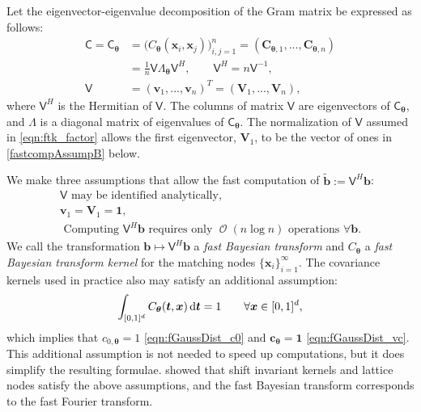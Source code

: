 \documentclass[graybox,footinfo]{svmult}
\DeclareMathOperator{\Order}{{\mathcal O}}
\newcommand{\bm}[1]{\boldsymbol{#1}}
\newcommand{\vtheta}{{\bm{\theta}}}
\newcommand{\vb}{\bm{b}}
\newcommand{\vc}{\bm{c}}
\newcommand{\vC}{\bm{C}}
\newcommand{\vt}{\bm{t}}
\newcommand{\vv}{\bm{v}}
\newcommand{\vV}{\bm{V}}
\newcommand{\vx}{\bm{x}}
\newcommand{\vone}{\bm{1}}
\newcommand{\mC}{\mathsf{C}}
\newcommand{\mCtheta}{{\mathsf{C}_{\vtheta}}}
\newcommand{\mLambda}{\mathsf{\Lambda}}
\newcommand{\mV}{\mathsf{V}}
\begin{document}
Let the eigenvector-eigenvalue decomposition of the Gram matrix be expressed as follows:
\begin{align}
\nonumber
\mC = \mCtheta &= \Big(C_\vtheta(\vx_i,\vx_j)\Big)_{i,j=1}^n  = (\vC_{\vtheta,1},...,\vC_{\vtheta,n}) 
\\
\label{eqn:ftk_factor}
&= \frac 1n \mV \mLambda_\vtheta \mV^H , 
\quad \quad \mV^H = n \mV^{-1}, \\
\nonumber
\mV &= (\vv_1,...,\vv_n)^T = (\vV_1,...,\vV_n),
\end{align}
where $\mV^H$ is the Hermitian of $\mV$.
The columns of matrix $\mV$ are eigenvectors of $\mC_\vtheta$, and $\mLambda$ is a diagonal matrix of eigenvalues of $\mC_\vtheta$. The normalization of $\mV$ assumed in \eqref{eqn:ftk_factor} allows the first eigenvector, $\vV_1$, to be the vector of ones in \eqref{fastcompAssumpB} below.

We make three assumptions that allow the fast computation of $\widetilde{\vb} := \mV^H \vb$:
\begin{subequations} \label{fastcompAssump}
	\begin{gather}
	\label{fastcompAssumpA}
	\mV \text{ may be identified analytically}, \\
	\label{fastcompAssumpB}
	\vv_1 = \vV_1 = \vone, \\
	\label{fastcompAssumpC}
	\text{ Computing $\mV^H \vb$ requires only $\Order(n \log n)$ operations } \forall \vb.
	\end{gather}
\end{subequations}
We call the transformation $\vb \mapsto \mV^H \vb$ a \emph{fast Bayesian transform} and $C_\vtheta$ a \emph{fast Bayesian transform kernel} for the matching nodes $\{\vx_i\}_{i=1}^\infty$.  The covariance kernels used in practice also may satisfy an additional assumption:
\begin{equation} \label{addAssump}
\int_{[0,1]^d} C_\vtheta(\vt,\vx) \, \D \vt = 1 \qquad \forall \vx \in [0,1]^d,
\end{equation}
which implies that $c_{0,\vtheta} = 1$ \eqref{eqn:fGaussDist_c0} and $\vc_{\vtheta} = \vone$ 	\eqref{eqn:fGaussDist_vc}.  This additional assumption is not needed to speed up computations, but it does simplify the resulting formulae.  \cite{RatHic19a} showed that shift invariant kernels and lattice nodes satisfy the above assumptions, and the fast Bayesian transform corresponds to the fast Fourier transform.
\end{document}
